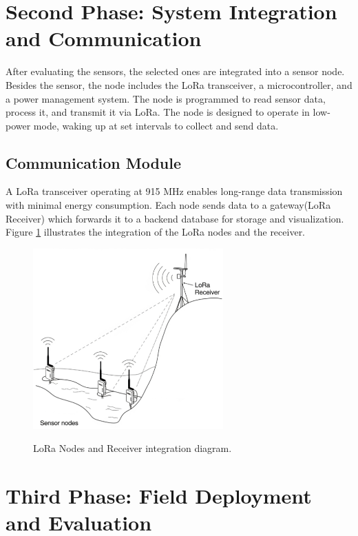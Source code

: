 \section{Second Phase: System Integration and Communication}

After evaluating the sensors, the selected ones are integrated into a sensor node. Besides the sensor, the node includes the LoRa transceiver, a microcontroller, and a power management system.  The node is programmed to read sensor data, process it, and transmit it via LoRa. The node is designed to operate in low-power mode, waking up at set intervals to collect and send data.

\subsection{Communication Module}
A LoRa transceiver operating at 915 MHz enables long-range data transmission with minimal energy consumption. Each node sends data to a gateway(LoRa Receiver) which forwards it to a backend database for storage and visualization. Figure \ref{fig:node_integration_diagram} illustrates the integration of the LoRa nodes and the receiver.

\begin{figure}[h]
    \centering
    \caption{LoRa Nodes and Receiver integration diagram.}
    \includegraphics[width=0.65\textwidth]{figuras/lora_nodes_and_receiver.PNG}
    \label{fig:node_integration_diagram}
\end{figure}

\section{Third Phase: Field Deployment and Evaluation}

